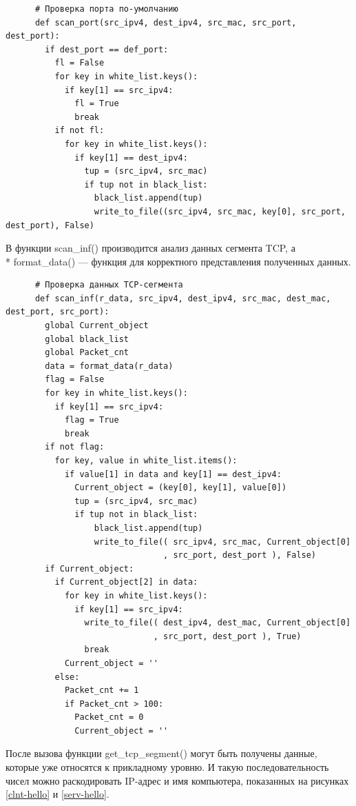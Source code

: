 \documentclass[bachelor, och, coursework]{SCWorks}
\begin{document}
    \begin{verbatim}
      # Проверка порта по-умолчанию
      def scan_port(src_ipv4, dest_ipv4, src_mac, src_port, dest_port):
        if dest_port == def_port:
          fl = False
          for key in white_list.keys():
            if key[1] == src_ipv4:
              fl = True
              break
          if not fl:
            for key in white_list.keys():
              if key[1] == dest_ipv4:
                tup = (src_ipv4, src_mac)    
                if tup not in black_list:
                  black_list.append(tup)
                  write_to_file((src_ipv4, src_mac, key[0], src_port, dest_port), False)
    \end{verbatim}

    В функции scan\_inf() производится анализ данных сегмента TCP, а \\* format\_data() --- функция для корректного представления полученных данных.

    \begin{verbatim}
      # Проверка данных TCP-сегмента
      def scan_inf(r_data, src_ipv4, dest_ipv4, src_mac, dest_mac, dest_port, src_port):
        global Current_object
        global black_list
        global Packet_cnt
        data = format_data(r_data)
        flag = False
        for key in white_list.keys():
          if key[1] == src_ipv4:
            flag = True
            break
        if not flag:
          for key, value in white_list.items():
            if value[1] in data and key[1] == dest_ipv4:
              Current_object = (key[0], key[1], value[0])
              tup = (src_ipv4, src_mac)
              if tup not in black_list:
                  black_list.append(tup)
                  write_to_file(( src_ipv4, src_mac, Current_object[0]
                                , src_port, dest_port ), False)
        if Current_object:
          if Current_object[2] in data:
            for key in white_list.keys():
              if key[1] == src_ipv4:
                write_to_file(( dest_ipv4, dest_mac, Current_object[0]
                              , src_port, dest_port ), True)
                break
            Current_object = ''
          else:
            Packet_cnt += 1
            if Packet_cnt > 100:
              Packet_cnt = 0
              Current_object = '' 
    \end{verbatim}
    
    После вызова функции get\_tcp\_segment() могут быть получены данные, которые уже относятся к прикладному уровню. И такую последовательность чисел
    можно раскодировать IP-адрес и имя компьютера, показанных на рисунках \ref{clnt-hello} и \ref{serv-hello}.
\end{document}
